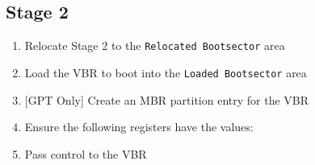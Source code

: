 \begin{samepage}
\subsection{Stage 2}

\begin{enumerate}
	\item Relocate Stage 2 to the \texttt{Relocated Bootsector} area
	\item Load the VBR to boot into the \texttt{Loaded Bootsector} area
	\item{} [GPT Only] Create an MBR partition entry for the VBR
	\item Ensure the following registers have the values:
	\item Pass control to the VBR
\end{enumerate}
\end{samepage}
